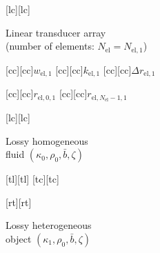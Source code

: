 
[lc][lc]{\footnotesize \parbox[t]{6cm}{Linear transducer array\\(number of elements: $N_{\text{el}} = N_{\text{el}, 1}$)}}
[cc][cc]{\footnotesize $w_{\text{el}, 1}$}
[cc][cc]{\footnotesize $k_{\text{el}, 1}$}
[cc][cc]{\footnotesize $\Delta r_{\text{el}, 1}$}

[cc][cc]{\footnotesize $r_{\text{el}, 0, 1}$}
[cc][cc]{\footnotesize $r_{\text{el}, N_{\text{el}} - 1, 1}$}

[lc][lc]{\footnotesize \parbox[t]{2.5cm}{Lossy homogeneous\\fluid $\displaystyle ( \kappa_{0}, \rho_{0}, \bar{b}, \zeta )$}}

[tl][tl]{}
[tc][tc]{}

[rt][rt]{\footnotesize \parbox[t]{2.75cm}{\raggedleft Lossy heterogeneous\\object $\displaystyle ( \kappa_{1}, \rho_{0}, \bar{b}, \zeta )$}}

